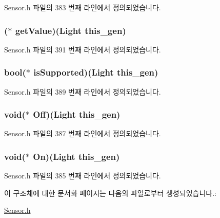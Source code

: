Sensor.\-h 파일의 383 번째 라인에서 정의되었습니다.

\hypertarget{struct___light_a167b8ee698bc8f2db75089756d4d58d3}{
\subsubsection[{get\-Value}]{($\ast$  get\-Value)({\bf Light} this\-\_\-gen)}}\label{struct___light_a167b8ee698bc8f2db75089756d4d58d3}


Sensor.\-h 파일의 391 번째 라인에서 정의되었습니다.

\hypertarget{struct___light_a26d33e377912ff1d4fc10f17c512231b}{
\subsubsection[{is\-Supported}]{\setlength{\rightskip}{0pt plus 5cm}bool($\ast$  is\-Supported)({\bf Light} this\-\_\-gen)}}\label{struct___light_a26d33e377912ff1d4fc10f17c512231b}


Sensor.\-h 파일의 389 번째 라인에서 정의되었습니다.

\hypertarget{struct___light_a774f07653a84b4ea9c2a31db11fd7281}{
\subsubsection[{Off}]{\setlength{\rightskip}{0pt plus 5cm}void($\ast$  Off)({\bf Light} this\-\_\-gen)}}\label{struct___light_a774f07653a84b4ea9c2a31db11fd7281}


Sensor.\-h 파일의 387 번째 라인에서 정의되었습니다.

\hypertarget{struct___light_a5c0d86bf418b917aa9aa5a9eed12dcca}{
\subsubsection[{On}]{\setlength{\rightskip}{0pt plus 5cm}void($\ast$  On)({\bf Light} this\-\_\-gen)}}\label{struct___light_a5c0d86bf418b917aa9aa5a9eed12dcca}


Sensor.\-h 파일의 385 번째 라인에서 정의되었습니다.



이 구조체에 대한 문서화 페이지는 다음의 파일로부터 생성되었습니다.\-:\begin{DoxyCompactItemize}
\item 
\hyperlink{_sensor_8h}{Sensor.\-h}\end{DoxyCompactItemize}
